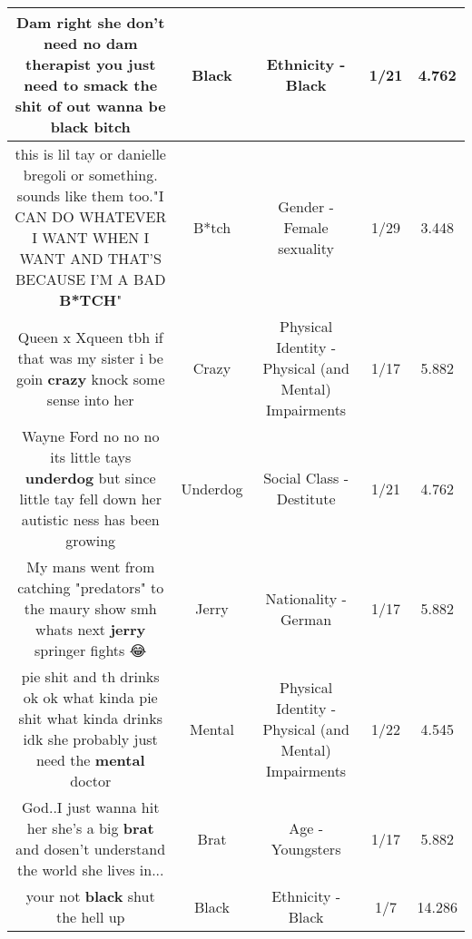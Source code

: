 \documentclass[11pt]{article}
\newlength\mylength
\begin{document}
\begin{center}
\begin{longtable}{|C{.65\mylength}|C{.30\mylength}|C{.12\mylength}|C{.12\mylength}|C{.12\mylength}|}
  \small Dam right she don't need no dam therapist you just need to smack the shit of out wanna be \textbf{black} bitch\normalsize   & Black & Ethnicity - Black & 1/21 & 4.762 \\  \hline
  \small this is lil tay or danielle bregoli or something. sounds like them too."I CAN DO WHATEVER I WANT WHEN I WANT AND THAT'S BECAUSE I'M A BAD \textbf{B*TCH}"\normalsize   & B*tch & Gender - Female sexuality & 1/29 & 3.448 \\  \hline
  \small Queen x Xqueen tbh if that was my sister i be goin \textbf{crazy} knock some sense into her\normalsize   & Crazy & Physical Identity - Physical (and Mental) Impairments & 1/17 & 5.882 \\  \hline
  \small Wayne Ford no no no its little tays \textbf{underdog} but since little tay fell down her autistic ness has been growing\normalsize   & Underdog & Social Class - Destitute & 1/21 & 4.762 \\  \hline
  \small My mans went from catching "predators" to the maury show smh whats next \textbf{jerry} springer fights 😂\normalsize   & Jerry & Nationality - German & 1/17 & 5.882 \\  \hline
  \small pie shit and th drinks ok ok what kinda pie shit what kinda drinks idk she probably just need the \textbf{mental} doctor\normalsize   & Mental & Physical Identity - Physical (and Mental) Impairments & 1/22 & 4.545 \\  \hline
  \small God..I just wanna hit her she's a big \textbf{brat} and dosen't understand the world she lives in...\normalsize   & Brat & Age - Youngsters & 1/17 & 5.882 \\  \hline
  \small your not \textbf{black} shut the hell up\normalsize   & Black & Ethnicity - Black & 1/7 & 14.286 \\  \hline

\end{longtable}
\end{center}
\end{document}
